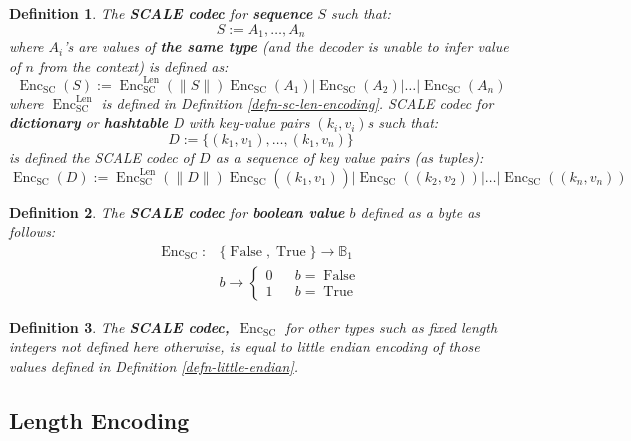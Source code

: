 \documentclass{book}
\newcommand{\assign}{:=}
\newcommand{\tmop}[1]{\ensuremath{\operatorname{#1}}}
\newcommand{\tmstrong}[1]{\textbf{#1}}
\newcommand{\tmtextbf}[1]{{\bfseries{#1}}}
\newtheorem{definition}{Definition}
\providecommand{\tmop}[1]{\ensuremath{\mathrm{#1}}}
\providecommand{\tmstrong}[1]{\tmtextbf{#1}}
\providecommand{\tmtextbf}[1]{\tmtextbf{#1}}
\newtheorem{definition}{Definition}
\begin{document}
\begin{definition}
  \label{defn-scale-list}The {\tmstrong{SCALE codec}} for
  {\tmstrong{sequence}} $S$ such that:
  \[ S \assign A_1, \ldots, A_n \]
  where $A_i$'s are values of {\tmstrong{the same type}} (and the decoder is
  unable to infer value of $n$ from the context) is defined as:
  \[ \tmop{Enc}_{\tmop{SC}} (S) \assign \tmop{Enc}^{\tmop{Len}}_{\tmop{SC}}
     (\| S \|) \tmop{Enc}_{\tmop{SC}} (A_1) | \tmop{Enc}_{\tmop{SC}} (A_2) |
     \ldots | \tmop{Enc}_{\tmop{SC}} (A_n) \]
  where $\tmop{Enc}_{\tmop{SC}}^{\tmop{Len}}$ is defined in Definition
  \ref{defn-sc-len-encoding}. SCALE codec for {\tmstrong{dictionary}} or
  {\tmstrong{hashtable}} D with key-value pairs $(k_i, v_i)$s such that:
  \[ D \assign \{ (k_1, v_1), \ldots, (k_1, v_n) \} \]
  is defined the SCALE codec of $D$ as a sequence of key value pairs (as
  tuples):
  \[ \tmop{Enc}_{\tmop{SC}} (D) \assign \tmop{Enc}^{\tmop{Len}}_{\tmop{SC}}
     (\| D \|) \tmop{Enc}_{\tmop{SC}} ((k_1, v_1)_{}) | \tmop{Enc}_{\tmop{SC}}
     ((k_2, v_2)) | \ldots | \tmop{Enc}_{\tmop{SC}} ((k_n, v_n)) \]
  \[ \  \]
\end{definition}

\begin{definition}
  The {\tmstrong{SCALE codec}} for {\tmstrong{boolean value}} $b$ defined as a
  byte as follows:
  \[ \begin{array}{ll}
       \tmop{Enc}_{\tmop{SC}} : & \{ \tmop{False}, \tmop{True} \} \rightarrow
       \mathbb{B}_1\\
       & b \rightarrow \left\{ \begin{array}{lcl}
         0 &  & b = \tmop{False}\\
         1 &  & b = \tmop{True}
       \end{array} \right.
     \end{array} \]
\end{definition}

\begin{definition}
  The {\tmstrong{SCALE codec, $\tmop{Enc}_{\tmop{SC}}$}} for other types such
  as fixed length integers not defined here otherwise, is equal to little
  endian encoding of those values defined in Definition
  \ref{defn-little-endian}. 
\end{definition}

\subsection{Length Encoding}\label{sect-int-encoding}
\end{document}
